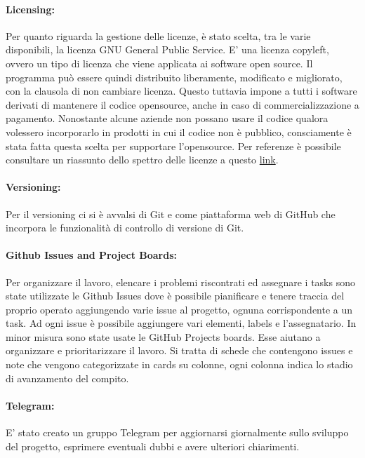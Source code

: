     \paragraph{Licensing: } 
    Per quanto riguarda la gestione delle licenze, è stato scelta, tra le varie disponibili, la licenza GNU General Public Service. E' una licenza copyleft, ovvero un tipo di licenza che viene applicata ai software open source. Il programma può essere quindi distribuito liberamente, modificato e migliorato, con la clausola di non cambiare licenza. Questo tuttavia impone a tutti i software derivati di mantenere il codice opensource, anche in caso di commercializzazione a pagamento.
    Nonostante alcune aziende non possano usare il codice qualora volessero incorporarlo in prodotti in cui il codice non è pubblico, consciamente è stata fatta questa scelta per supportare l'opensource.
    Per referenze è possibile consultare un riassunto dello spettro delle licenze a questo \href{https://choosealicense.com/licenses/}{link}.
    
    \paragraph{Versioning: }
    Per il versioning ci si è avvalsi di Git e come piattaforma web di GitHub che incorpora le funzionalità di controllo di versione di Git. 
    
    \paragraph{Github Issues and Project Boards: }
    
    Per organizzare il lavoro, elencare i problemi riscontrati ed assegnare i tasks sono state utilizzate le Github Issues dove è possibile pianificare e tenere traccia del proprio operato aggiungendo varie issue al progetto, ognuna corrispondente a un task. Ad ogni issue è possibile aggiungere vari elementi, labels e l'assegnatario. \newline In minor misura sono state usate le GitHub Projects boards. Esse aiutano a organizzare e prioritarizzare il lavoro. Si tratta di schede che contengono issues e note che vengono categorizzate in cards su colonne, ogni colonna indica lo stadio di avanzamento del compito.
   
    \paragraph{Telegram: }
    E' stato creato un gruppo Telegram per aggiornarsi giornalmente sullo sviluppo del progetto, esprimere eventuali dubbi e avere ulteriori chiarimenti. 
    
